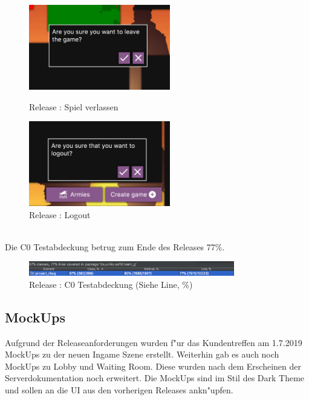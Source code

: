 \documentclass[12pt, titlepage]{scrartcl}
\newcommand{\RN}[1]{%
	\textup{\uppercase\expandafter{\romannumeral#1}}%
}
\begin{document}
		        \begin{figure}[H]
                    \centering
                    \begin{minipage}{0.55\textwidth}
                        \centering
                        \includegraphics[width=0.55\textwidth]{images/old_state/additional/LeaveGame.png}
                        \caption{Release \RN{2}: Spiel verlassen}
                        \label{Leave_Game}
                    \end{minipage}%
                    \begin{minipage}{0.55\textwidth}
                        \centering
                        \includegraphics[width=0.55\textwidth]{images/old_state/additional/Logout.png}
                        \caption{Release \RN{2}: Logout}
                        \label{Logout}
                    \end{minipage}
                \end{figure}
                \ \\ Die C0 Testabdeckung betrug zum Ende des Releases \RN{2} 77\%.
                \begin{figure}[H] 
    				\centering
    				\includegraphics[width=0.8\textwidth]{images/old_state/Coverage.png}
    				\caption{Release \RN{2}: C0 Testabdeckung (Siehe Line, \%)}
    				\label{Coverage}
			    \end{figure}
	    \subsection{MockUps}
	        Aufgrund der Releaseanforderungen wurden f"ur das Kundentreffen am 1.7.2019 MockUps zu der neuen Ingame Szene erstellt. Weiterhin gab es auch noch MockUps zu Lobby und Waiting Room. Diese wurden nach dem Erscheinen der Serverdokumentation noch erweitert. Die MockUps sind im Stil des Dark Theme und sollen an die UI aus den vorherigen Releases ankn"upfen.
\end{document}
